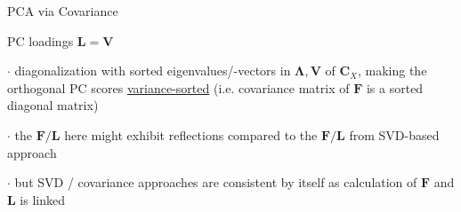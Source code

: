 \documentclass[mathserif, aspectratio=1610]{intbeamer}
\begin{document}
\begin{frame}[t]{PCA via Covariance}
\begin{minipage}[t]{0.49\textwidth}
PC loadings $\bm{L} = \bm{V}$

\end{minipage}

\vspace{0.5em}

$\cdot$ diagonalization with sorted eigenvalues/-vectors in $\bm{\Lambda}, \bm{V}$ of $\bm{C}_X$, making the orthogonal PC scores \underline{variance-sorted} (i.e. covariance matrix of $\bm{F}$ is a sorted diagonal matrix)

$\cdot$ the $\bm{F} / \bm{L}$ here might exhibit reflections compared to the $\bm{F} / \bm{L}$ from SVD-based approach

$\cdot$ but SVD / covariance approaches are consistent by itself as calculation of $\bm{F}$ and $\bm{L}$ is linked

\end{frame}
\end{document}

